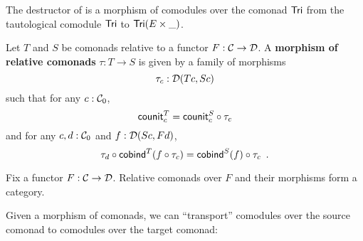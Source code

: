 \documentclass{amsart}
\newcommand{\fat}[1]{\textbf{#1}}
\begin{document}
% 
%   
% 
%  
%  





\begin{example}\label{ex:tail_comodule}
 The destructor \constfont{\tail} of  is a morphism of comodules over the comonad $\Tri$ 
  from the tautological comodule  $\Tri$ to $\Tri(E\times \_)$.
\end{example}


\begin{definition}
 Let $T$ and $S$ be comonads relative to a functor $F : \C \to \D$. A \fat{morphism of relative comonads} $\tau : T \to S$
  is given by a family of morphisms \[\tau_c : \D(Tc,Sc)\] such that for any $c : \C_0$,
     \[  \counit^T_c = \comp{\tau_c}{\counit^S_c} \]
   and for any $c,d : \C_0$ and $f : \D(Sc,Fd)$,
   \[  \comp{\cobind^T(\comp{\tau_c}{f})}{\tau_d} = \comp{\tau_c}{\cobind^S(f)} \enspace .  \]
\end{definition}

\begin{remark}
 Fix a functor $F : \C\to\D$. Relative comonads over $F$ and their morphisms form a category.
\end{remark}

%    


Given a morphism of comonads, we can \enquote{transport} comodules over the source comonad to comodules over the target comonad:
\end{document}

